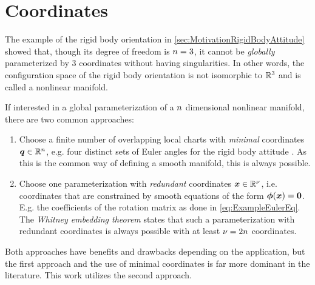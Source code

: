 \section{Coordinates}\label{sec:MathCoordinates}
The example of the rigid body orientation in \autoref{sec:MotivationRigidBodyAttitude} showed that, though its degree of freedom is $n=3$, it cannot be \textit{globally} parameterized by 3 coordinates without having singularities.
In other words, the configuration space of the rigid body orientation is not isomorphic to $\mathbb{R}^3$ and is called a nonlinear manifold.

If interested in a global parameterization of a $n$ dimensional nonlinear manifold, there are two common approaches:
\begin{enumerate}
 \item Choose a finite number of overlapping local charts with \textit{minimal} coordinates $\boldsymbol{q} \in \mathbb{R}^n$, e.g. four distinct sets of Euler angles for the rigid body attitude \cite{Grafarend:AtlasSO3}.
 As this is the common way of defining a smooth manifold, this is always possible.
 \item Choose one parameterization with \textit{redundant} coordinates $\boldsymbol{x} \in \mathbb{R}^{\nu}$, i.e. coordinates that are constrained by smooth equations of the form $\boldsymbol{\phi}(\boldsymbol{x}) = \boldsymbol{0}$.
 E.g. the coefficients of the rotation matrix as done in \eqref{eq:ExampleEulerEq}.
 The \textit{Whitney embedding theorem} states that such a parameterization with redundant coordinates is always possible with at least $\nu = 2n$ coordinates.
\end{enumerate}
Both approaches have benefits and drawbacks depending on the application, but the first approach and the use of minimal coordinates is far more dominant in the literature.
This work utilizes the second approach.


